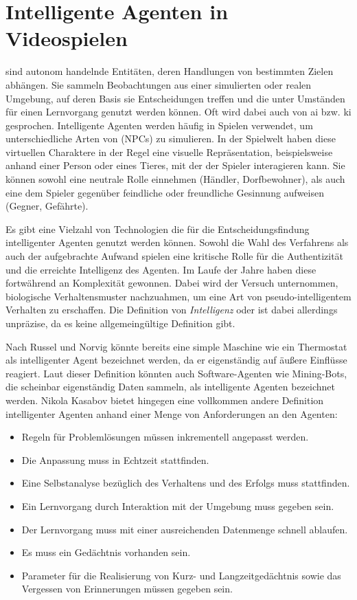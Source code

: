 \chapter{Intelligente Agenten in Videospielen}\label{intelligente_agenten}
 sind autonom handelnde Entitäten, deren Handlungen von bestimmten Zielen abhängen. Sie sammeln Beobachtungen aus einer simulierten oder realen Umgebung, auf deren Basis sie Entscheidungen treffen und die unter Umständen für einen Lernvorgang genutzt werden können. Oft wird dabei auch von \ac{ai} bzw. \ac{ki} gesprochen. Intelligente Agenten werden häufig in Spielen verwendet, um unterschiedliche Arten von  (NPCs) zu simulieren. In der Spielwelt haben diese virtuellen Charaktere in der Regel eine visuelle Repräsentation, beispielsweise anhand einer Person oder eines Tieres, mit der der Spieler interagieren kann. Sie können sowohl eine neutrale Rolle einnehmen (Händler, Dorfbewohner), als auch eine dem Spieler gegenüber feindliche oder freundliche Gesinnung aufweisen (Gegner, Gefährte).

Es gibt eine Vielzahl von Technologien die für die Entscheidungsfindung intelligenter Agenten genutzt werden können. Sowohl die Wahl des Verfahrens als auch der aufgebrachte Aufwand spielen eine kritische Rolle für die Authentizität und die erreichte Intelligenz des Agenten. Im Laufe der Jahre haben diese fortwährend an Komplexität gewonnen. Dabei wird der Versuch unternommen, biologische Verhaltensmuster nachzuahmen, um eine Art von pseudo-intelligentem Verhalten zu erschaffen. Die Definition von \textit{Intelligenz} oder  ist dabei allerdings unpräzise, da es keine allgemeingültige Definition gibt.

Nach Russel und Norvig \cite{art_int_mod_app} könnte bereits eine simple Maschine wie ein Thermostat als intelligenter Agent bezeichnet werden, da er eigenständig auf äußere Einflüsse reagiert. Laut dieser Definition könnten auch Software-Agenten wie Mining-Bots, die scheinbar eigenständig Daten sammeln, als intelligente Agenten bezeichnet werden. Nikola Kasabov \cite{kasabov} bietet hingegen eine vollkommen andere  Definition intelligenter Agenten anhand einer Menge von Anforderungen an den Agenten:

\begin{itemize}
    \item Regeln für Problemlösungen müssen inkrementell angepasst werden.
    \item Die Anpassung muss in Echtzeit stattfinden.
    \item Eine Selbstanalyse bezüglich des Verhaltens und des Erfolgs muss stattfinden.
    \item Ein Lernvorgang durch Interaktion mit der Umgebung muss gegeben sein.
    \item Der Lernvorgang muss mit einer ausreichenden Datenmenge schnell ablaufen.
    \item Es muss ein Gedächtnis vorhanden sein.
    \item Parameter für die Realisierung von Kurz- und Langzeitgedächtnis sowie das Vergessen von Erinnerungen müssen gegeben sein.
\end{itemize}

